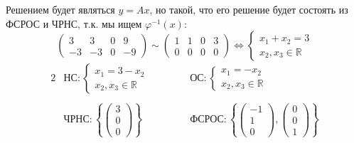 \documentclass{article}
\begin{document}
\begin{center}
Решением будет являться $y = Ax$, но такой, что его решение будет состоять из ФСРОС и ЧРНС, т.к. мы ищем $\varphi^{-1}(x)$:
$$\left(\begin{array}{rrr|r}
3 & 3 & 0 & 9 \\ -3 & -3 & 0 & -9
\end{array}\right) \sim \left(\begin{array}{rrr|r}
1 & 1 & 0 & 3 \\ 0 & 0 & 0 & 0
\end{array}\right) \Leftrightarrow \begin{cases}
x_1 + x_2 = 3 \\
x_2, x_3 \in \mathbb{R}
\end{cases}$$
\begin{alignat*}{2}
&НС: \begin{cases}
x_1 = 3 - x_2 \\
x_2, x_3 \in \mathbb{R}
\end{cases}& ОС: \begin{cases}
x_1 = - x_2 \\
x_2, x_3 \in \mathbb{R}
\end{cases} \\ \, \\
&ЧРНС: \left\{\begin{pmatrix}
3 \\ 0 \\ 0
\end{pmatrix}\right\}\qquad\qquad &ФСРОС: \left\{\begin{pmatrix}
-1 \\ 1 \\ 0
\end{pmatrix}, \begin{pmatrix}
0 \\ 0 \\ 1
\end{pmatrix}\right\}
\end{alignat*} \\
\end{center}
\end{document}
